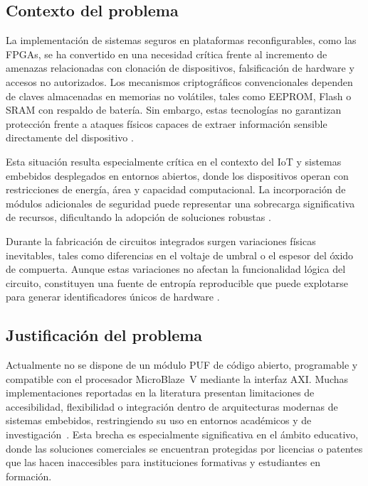 \subsection{Contexto del problema}

La implementación de sistemas seguros en plataformas reconfigurables, como las FPGAs,
se ha convertido en una necesidad crítica frente al incremento de amenazas relacionadas
con clonación de dispositivos, falsificación de hardware y accesos no autorizados.
Los mecanismos criptográficos convencionales dependen de claves almacenadas en memorias
no volátiles, tales como EEPROM, Flash o SRAM con respaldo de batería. Sin embargo,
estas tecnologías no garantizan protección frente a ataques físicos capaces de extraer
información sensible directamente del dispositivo \cite{hou_2019_lightweight}.

Esta situación resulta especialmente crítica en el contexto del IoT y sistemas embebidos
desplegados en entornos abiertos, donde los dispositivos operan con restricciones de
energía, área y capacidad computacional. La incorporación de módulos adicionales de
seguridad puede representar una sobrecarga significativa de recursos, dificultando la
adopción de soluciones robustas \cite{shamsoshoara_2020_puf, alhamarneh_2024_strengthening}.

Durante la fabricación de circuitos integrados surgen variaciones físicas inevitables,
tales como diferencias en el voltaje de umbral o el espesor del óxido de compuerta.
Aunque estas variaciones no afectan la funcionalidad lógica del circuito, constituyen
una fuente de entropía reproducible que puede explotarse para generar
identificadores únicos de hardware \cite{sudhanya_2016_silicon}.

\subsection{Justificación del problema}

Actualmente no se dispone de un módulo PUF de código abierto, programable y
compatible con el procesador MicroBlaze~V mediante la interfaz AXI.
Muchas implementaciones reportadas en la literatura presentan limitaciones de
accesibilidad, flexibilidad o integración dentro de arquitecturas modernas
de sistemas embebidos, restringiendo su uso en entornos académicos y de
investigación~\cite{lata_2023_fpgapuf, anandakumar_2021_fpgapufs}. Esta
brecha es especialmente significativa en el ámbito educativo, donde las
soluciones comerciales se encuentran protegidas por licencias o patentes que
las hacen inaccesibles para instituciones formativas y estudiantes en
formación.

